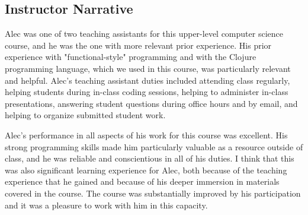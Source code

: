 
\subsection*{Instructor Narrative}
Alec was one of two teaching assistants for this upper-level computer
science course, and he was the one with more relevant prior experience.
His prior experience with "functional-style" programming and with
the Clojure programming language, which we used in this course, was
particularly relevant and helpful. Alec's teaching assistant duties
included attending class regularly, helping students during in-class
coding sessions, helping to administer in-class presentations, answering
student questions during office hours and by email, and helping to
organize submitted student work.

Alec's performance in all aspects of his work for this course was
excellent. His strong programming skills made him particularly valuable
as a resource outside of class, and he was reliable and conscientious
in all of his duties. I think that this was also significant learning
experience for Alec, both because of the teaching experience that he
gained and because of his deeper immersion in materials covered in the
course. The course was substantially improved by his participation and
it was a pleasure to work with him in this capacity.
